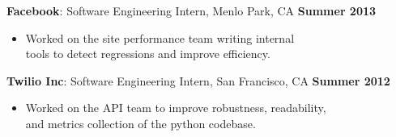 \documentclass[sectioned]{dsyangres}
\begin{document}
\begin{resume}

\textbf{Facebook}: Software Engineering Intern,
Menlo Park, CA \hfill \textbf{Summer 2013}
  \begin{itemize} \itemsep -2pt
    \item Worked on the site performance team writing internal \\
      tools to detect regressions and improve efficiency.
  \end{itemize}


\textbf{Twilio Inc}: Software Engineering Intern,
 San Francisco, CA \hfill \textbf{Summer 2012}
  \begin{itemize} \itemsep -2pt
    \item Worked on the API team to improve robustness, readability, \\
      and metrics collection of the python codebase.
  \end{itemize}




\end{resume}
\end{document}
